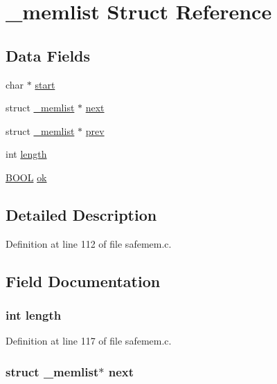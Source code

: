 \hypertarget{struct__memlist}{\section{\-\_\-memlist Struct Reference}
\label{struct__memlist}
}
\subsection*{Data Fields}
\begin{DoxyCompactItemize}
\item 
char $\ast$ \hyperlink{struct__memlist_ab40328f79e021050ac262dc0a6019667}{start}
\item 
struct \hyperlink{struct__memlist}{\-\_\-memlist} $\ast$ \hyperlink{struct__memlist_a1847396f97fd84beffe2edc08fe000c5}{next}
\item 
struct \hyperlink{struct__memlist}{\-\_\-memlist} $\ast$ \hyperlink{struct__memlist_ad18781e89269318ca9b53b1f673056c3}{prev}
\item 
int \hyperlink{struct__memlist_a9f59b34b1f25fe00023291b678246bcc}{length}
\item 
\hyperlink{_sys_defs_8h_a2df9d82ef74025dde989a5ae3edc886c}{B\-O\-O\-L} \hyperlink{struct__memlist_ab89bc11c843f92ea91cc97d33f20d72c}{ok}
\end{DoxyCompactItemize}


\subsection{Detailed Description}


Definition at line 112 of file safemem.\-c.



\subsection{Field Documentation}
\hypertarget{struct__memlist_a9f59b34b1f25fe00023291b678246bcc}{
\subsubsection[{length}]{\setlength{\rightskip}{0pt plus 5cm}int length}}\label{struct__memlist_a9f59b34b1f25fe00023291b678246bcc}


Definition at line 117 of file safemem.\-c.

\hypertarget{struct__memlist_a1847396f97fd84beffe2edc08fe000c5}{
\subsubsection[{next}]{\setlength{\rightskip}{0pt plus 5cm}struct {\bf \-\_\-memlist}$\ast$ next}}\label{struct__memlist_a1847396f97fd84beffe2edc08fe000c5}


